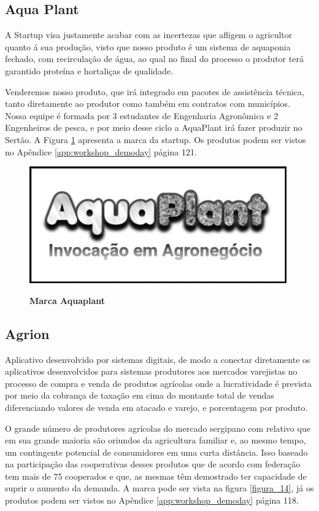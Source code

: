 \subsection{Aqua Plant}



A Startup visa justamente acabar com as incertezas que afligem o agricultor quanto á sua produção, visto que nosso produto é um sistema de aquaponia fechado, com recirculação de água, ao qual no final do processo o produtor terá garantido proteína e hortaliças de qualidade.

Venderemos nosso produto, que irá integrado em pacotes de assistência técnica, tanto diretamente ao produtor como também em contratos com municípios. Nossa equipe é formada por 3 estudantes de Engenharia Agronômica e 2 Engenheiros de pesca, e por meio desse ciclo a AquaPlant irá fazer produzir no Sertão. A Figura \ref{figura_13} apresenta a marca da startup. Os produtos podem ser vistos no Apêndice \ref{app:workshop_demoday} página 121.


\begin{figure}[H]
\centering
\caption{\textbf{Marca Aquaplant}}
\includegraphics[scale=0.5]{Imagens/aquaplant.png}
\label{figura_13}
\end{figure}


\subsection{Agrion}

Aplicativo desenvolvido por sistemas digitais, de modo a conectar diretamente os aplicativos desenvolvidos para sistemas produtores aos mercados varejistas no processo de compra e venda de produtos agrícolas onde a lucratividade é prevista por meio da cobrança de taxação em cima do montante total de vendas diferenciando valores de venda em atacado e varejo, e porcentagem por produto.

O grande número de produtores agrícolas do mercado sergipano com relativo que em sua grande maioria são oriundos da agricultura familiar e, ao mesmo tempo, um contingente potencial de consumidores em uma curta distância. Isso baseado na participação das cooperativas desses produtos que de acordo com federação tem mais de 75 cooperados e que, as mesmas têm demostrado ter capacidade de suprir o aumento da demanda. A marca pode ser vista na figura \ref{figura_14}, já os produtos podem ser vistos no Apêndice \ref{app:workshop_demoday} página 118.


